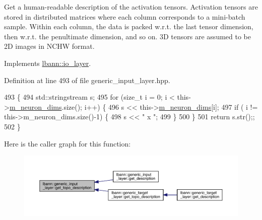 Get a human-\/readable description of the activation tensors. Activation tensors are stored in distributed matrices where each column corresponds to a mini-\/batch sample. Within each column, the data is packed w.\+r.\+t. the last tensor dimension, then w.\+r.\+t. the penultimate dimension, and so on. 3D tensors are assumed to be 2D images in N\+C\+HW format. 

Implements \hyperlink{classlbann_1_1io__layer_a955ab7100591d07d0758e8f95c6e50be}{lbann\+::io\+\_\+layer}.



Definition at line 493 of file generic\+\_\+input\+\_\+layer.\+hpp.


\begin{DoxyCode}
493                                                   \{
494     std::stringstream s;
495     \textcolor{keywordflow}{for} (\textcolor{keywordtype}{size\_t} i = 0; i < this->\hyperlink{classlbann_1_1Layer_abb34bb8031f57a483e2e327a5f229f48}{m\_neuron\_dims}.size(); i++) \{
496       s << this->\hyperlink{classlbann_1_1Layer_abb34bb8031f57a483e2e327a5f229f48}{m\_neuron\_dims}[i];
497       \textcolor{keywordflow}{if} ( i != this->m\_neuron\_dims.size()-1) \{
498         s << \textcolor{stringliteral}{" x "};
499       \}
500     \}
501     \textcolor{keywordflow}{return} s.str();;
502   \}
\end{DoxyCode}
Here is the caller graph for this function\+:\nopagebreak
\begin{figure}[H]
\begin{center}
\leavevmode
\includegraphics[width=350pt]{classlbann_1_1generic__input__layer_a36d9962105ca89889e3f38f1c1801560_icgraph}
\end{center}
\end{figure}
\mbox{\label{classlbann_1_1generic__input__layer_ab5b5318cf000fbdaf35a3545335b60b2}} 
